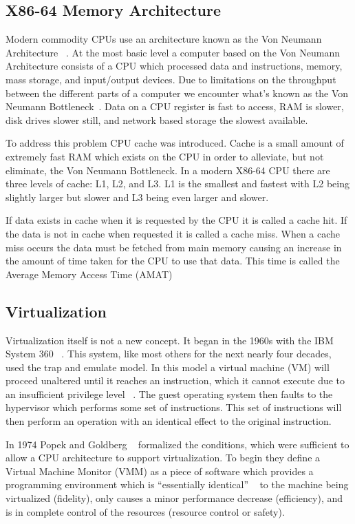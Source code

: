 \subsection{X86-64 Memory Architecture}

Modern commodity CPUs use an architecture known as the Von Neumann Architecture ~\cite{von_neumann_first_1993}.  At the most basic level a computer based on the Von Neumann Architecture consists of a CPU which processed data and instructions, memory, mass storage, and input/output devices.  Due to limitations on the throughput between the different parts of a computer we encounter what’s known as the Von Neumann Bottleneck~\cite{von_neumann_first_1993}.  Data on a CPU register is fast to access, RAM is slower, disk drives slower still, and network based storage the slowest available. 

To address this problem CPU cache was introduced. Cache is a small amount of extremely fast RAM which exists on the CPU in order to alleviate, but not eliminate, the Von Neumann Bottleneck.  In a modern X86-64 CPU there are three levels of cache: L1, L2, and L3. L1 is the smallest and fastest with L2 being slightly larger but slower and L3 being even larger and slower. 

If data exists in cache when it is requested by the CPU it is called a cache hit. If the data is not in cache when requested it is called a cache miss.  When a cache miss occurs the data must be fetched from main memory causing an increase in the amount of time taken for the CPU to use that data. This time is called the Average Memory Access Time (AMAT) 


\subsection{Virtualization}

Virtualization itself is not a new concept. It began in the 1960s with the IBM System 360 ~\cite{vleck_ibm_2010}. This system, like most others for the next nearly four decades, used the trap and emulate model. In this model a virtual machine (VM) will proceed unaltered until it reaches an instruction, which it cannot execute due to an insufficient privilege level ~\cite{popek_formal_1974}. The guest operating system then faults to the hypervisor which performs some set of instructions. This set of instructions will then perform an operation with an identical effect to the original instruction. 

In 1974 Popek and Goldberg ~\cite{popek_formal_1974} formalized the conditions, which were sufficient to allow a CPU architecture to support virtualization. To begin they define a Virtual Machine Monitor (VMM) as a piece of software which provides a programming environment which is ``essentially identical'' ~\cite{popek_formal_1974} to the machine being virtualized (fidelity), only causes a minor performance decrease (efficiency), and is in complete control of the resources (resource control or safety).

